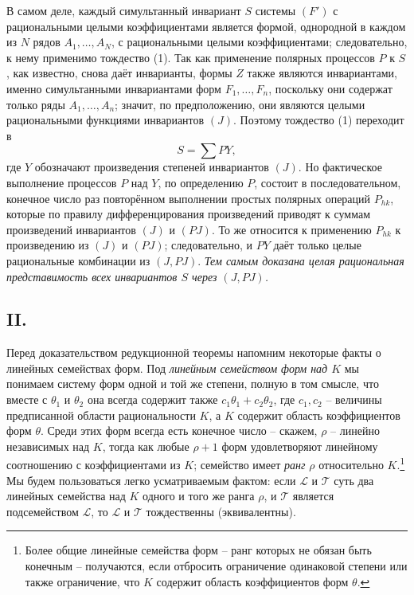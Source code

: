\documentclass[11pt]{article}
\begin{document}
В самом деле, каждый симультанный инвариант $S$ системы $(F')$ с рациональными целыми коэффициентами является формой, однородной в каждом из $N$ рядов $A_1,\ldots,A_N$, с рациональными целыми коэффициентами; следовательно, к нему применимо тождество (1). Так как применение полярных процессов $P$ к $S$, как известно, снова даёт инварианты, формы $Z$ также являются инвариантами, именно симультанными инвариантами форм $F_1,\ldots,F_n$, поскольку они содержат только ряды $A_1,\ldots,A_n$; значит, по предположению, они являются целыми рациональными функциями инвариантов $(J)$. Поэтому тождество (1) переходит в
\[
  S=\sum PY,
\]
где $Y$ обозначают произведения степеней инвариантов $(J)$. Но фактическое выполнение процессов $P$ над $Y$, по определению $P$, состоит в последовательном, конечное число раз повторённом выполнении простых полярных операций $P_{hk}$, которые по правилу дифференцирования произведений приводят к суммам произведений инвариантов $(J)$ и $(PJ)$. То же относится к применению $P_{hk}$ к произведению из $(J)$ и $(PJ)$; следовательно, и $PY$ даёт только целые рациональные комбинации из $(J,PJ)$. \emph{Тем самым доказана целая рациональная представимость всех инвариантов $S$ через $(J,PJ)$.}

\subsection*{II.}
Перед доказательством редукционной теоремы напомним некоторые факты о линейных семействах форм. Под \emph{линейным семейством форм над $K$} мы понимаем систему форм одной и той же степени, полную в том смысле, что вместе с $\theta_1$ и $\theta_2$ она всегда содержит также $c_1\theta_1+c_2\theta_2$, где $c_1,c_2$ -- величины предписанной области рациональности $K$, а $K$ содержит область коэффициентов форм $\theta$. Среди этих форм всегда есть конечное число -- скажем, $\rho$ -- линейно независимых над $K$, тогда как любые $\rho+1$ форм удовлетворяют линейному соотношению с коэффициентами из $K$; семейство имеет \emph{ранг $\rho$} относительно $K$.\footnote{Более общие линейные семейства форм -- ранг которых не обязан быть конечным -- получаются, если отбросить ограничение одинаковой степени или также ограничение, что $K$ содержит область коэффициентов форм $\theta$.} Мы будем пользоваться легко усматриваемым фактом: если $\mathcal L$ и $\mathcal T$ суть два линейных семейства над $K$ одного и того же ранга $\rho$, и $\mathcal T$ является подсемейством $\mathcal L$, то $\mathcal L$ и $\mathcal T$ тождественны (эквивалентны).
\end{document}
